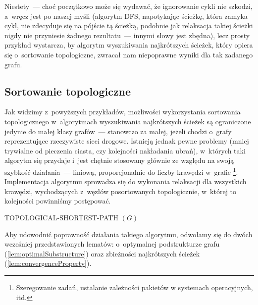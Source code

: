 Niestety~--- choć początkowo może się wydawać, że ignorowanie cykli nie szkodzi, a~wręcz jest po naszej myśli (algorytm \textsf{DFS}, napotykając ścieżkę, która zamyka cykl, nie zdecyduje się na pójście tą ścieżką, podobnie jak relaksacja takiej ścieżki nigdy nie przyniesie żadnego rezultatu~--- innymi słowy jest zbędna), lecz prosty przykład wystarcza, by algorytm wyszukiwania najkrótszych ścieżek, który opiera się o~sortowanie topologiczne, zwracał nam niepoprawne wyniki dla tak zadanego grafu.

\subsection{Sortowanie topologiczne}

Jak widzimy z~powyższych przykładów, możliwości wykorzystania sortowania topologicznego w~algorytmach wyszukiwania najkrótszych ścieżek są ograniczone jedynie do małej klasy grafów~--- stanowczo za małej, jeżeli chodzi o~grafy reprezentujące rzeczywiste sieci drogowe. Istnieją jednak pewne problemy (mniej trywialne od pieczenia ciasta, czy kolejności nakładania ubrań), w~których taki algorytm się przydaje i~jest chętnie stosowany głównie ze względu na swoją szybkość działania~--- liniową, proporcjonalnie do liczby krawędzi w~grafie \footnote{Szeregowanie zadań, ustalanie zależności pakietów w systemach operacyjnych, itd.}. Implementacja algorytmu sprowadza się do wykonania relaksacji dla wszystkich krawędzi, wychodzących z~węzłów posortowanych topologicznie, w~której to kolejności powinniśmy postępować.

\begin{pseudokod}[!htbp]
\DontPrintSemicolon
{}
\caption{ TOPOLOGICAL-SHORTEST-PATH $\left( G \right)$\label{alg:topologicalShorestPath}}
\end{pseudokod}

Aby udowodnić poprawność działania takiego algorytmu, odwołamy się do dwóch wcześniej przedstawionych lematów: o~optymalnej podstrukturze grafu (\ref{lem:optimalSubstructure}) oraz zbieżności najkrótszych ścieżek (\ref{lem:convergenceProperty}).


